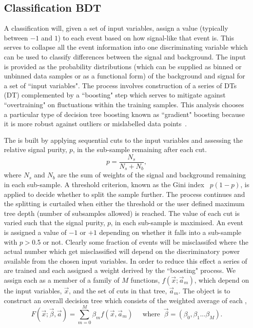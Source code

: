 \subsection{Classification \acs{BDT}}
A classification \BDT will, given a set of input variables, assign a value (typically between $-1$ and $1$) to each event based on how signal-like that event is. This serves to collapse all the event information into one discriminating variable which can be used to classify differences between the signal and background. The input is provided as the probability distributions (which can be supplied as binned or unbinned data samples or as a functional form) of the background and signal for a set of ``input variables". The process involves construction of a series of \aclp{DT} (\acs{DT}) complemented by a ``boosting" step which serves to mitigate against ``overtraining" on fluctuations within the training samples. This analysis chooses a particular type of decision tree boosting known as ``gradient" boosting because it is more robust against outliers or mislabelled data points~\cite{TMVA}.

The \DT is built by applying sequential cuts to the input variables and assessing the relative signal purity, $p$, in the sub-sample remaining after each cut.
\begin{equation}
  p = \frac{N_{s}}{N_{s}+N_{b}},
\end{equation}
where $N_{s}$ and $N_{b}$ are the sum of weights of the signal and background remaining in each sub-sample. A threshold criterion, known as the Gini index~\cite{TMVA} $p(1-p)$, is applied to decide whether to split the sample further. The process continues and the splitting is curtailed when either the threshold or the user defined maximum tree depth (number of subsamples allowed) is reached. The value of each cut is varied such that the signal purity, $p$, in each sub-sample is maximised. An event is assigned a value of $-1$ or $+1$ depending on whether it falls into a sub-sample with $p>$0.5 or not. Clearly some fraction of events will be misclassifed where the actual number which get misclassified will depend on the discriminatory power available from the chosen input variables. In order to reduce this effect a series of \DTs are trained and each assigned a weight derived by the ``boosting" process. 
We assign each \DT as a member of a family of $M$ functions, $f(\vec{x};\vec{a}_{m})$, which depend on the input variables, $\vec{x}$, and the set of cuts in that tree, $\vec{a}_{m}$. The object is to construct an overall decision tree which consists of the weighted average of each \DT,
\begin{equation}
  F(\vec{x};\vec{\beta},\vec{a}) = \sum_{m=0}^{M} \beta_{m}f(\vec{x},\vec{a}_{m}) \;\;\;\;\; \textrm{where} \;\; \vec{\beta} = (\beta_{0},\beta_{1}...\beta_{M}).
\end{equation}

